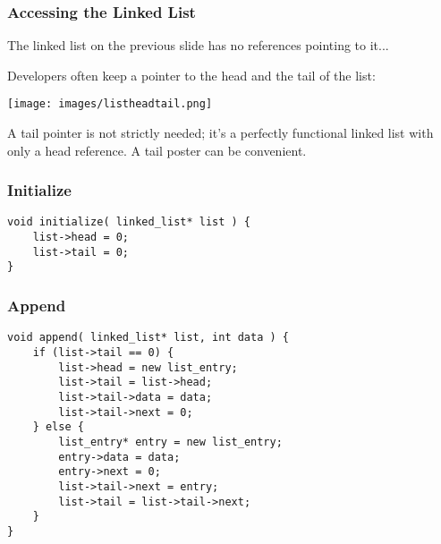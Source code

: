 \begin{frame}
\frametitle{Accessing the Linked List}
The linked list on the previous slide has no references pointing to it...

Developers often keep a pointer to the head and the tail of the list:

\begin{center}
    \texttt{[image: images/listheadtail.png]}
\end{center}

A tail pointer is not strictly needed; it's a perfectly functional linked list with only a head reference. A tail poster can be convenient.

\end{frame}



\begin{frame}[fragile]
\frametitle{Initialize}

\begin{verbatim}
void initialize( linked_list* list ) {
    list->head = 0;
    list->tail = 0;
}
\end{verbatim}

\end{frame}

\begin{frame}[fragile]
\frametitle{Append}

\begin{verbatim}
void append( linked_list* list, int data ) {
    if (list->tail == 0) {
        list->head = new list_entry;
        list->tail = list->head;
        list->tail->data = data;
        list->tail->next = 0;
    } else { 
        list_entry* entry = new list_entry;
        entry->data = data;
        entry->next = 0;
        list->tail->next = entry;
        list->tail = list->tail->next;
    }
}
\end{verbatim}

\end{frame}

